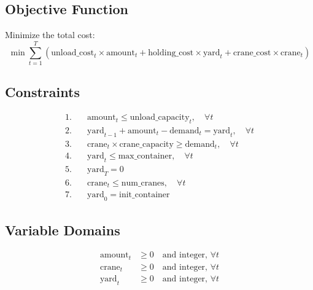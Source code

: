\documentclass{article}
\begin{document}
\subsection*{Objective Function}

Minimize the total cost:
\[
\min \sum_{t=1}^{T} \left( \text{unload\_cost}_t \times \text{amount}_t + \text{holding\_cost} \times \text{yard}_t + \text{crane\_cost} \times \text{crane}_t \right)
\]

\subsection*{Constraints}

\begin{align*}
1. & \quad \text{amount}_t \leq \text{unload\_capacity}_t, \quad \forall t \\
2. & \quad \text{yard}_{t-1} + \text{amount}_t - \text{demand}_t = \text{yard}_t, \quad \forall t \\
3. & \quad \text{crane}_t \times \text{crane\_capacity} \geq \text{demand}_t, \quad \forall t \\
4. & \quad \text{yard}_t \leq \text{max\_container}, \quad \forall t \\
5. & \quad \text{yard}_T = 0 \\
6. & \quad \text{crane}_t \leq \text{num\_cranes}, \quad \forall t \\
7. & \quad \text{yard}_0 = \text{init\_container}
\end{align*}

\subsection*{Variable Domains}

\begin{align*}
\text{amount}_t & \geq 0 \quad \text{and integer, } \forall t \\
\text{crane}_t & \geq 0 \quad \text{and integer, } \forall t \\
\text{yard}_t & \geq 0 \quad \text{and integer, } \forall t
\end{align*}
\end{document}
